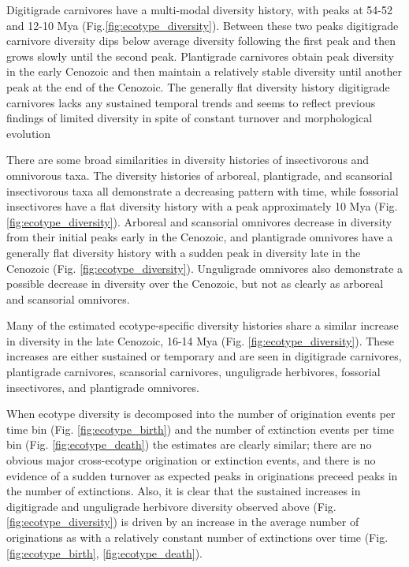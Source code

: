 \documentclass[12pt,letterpaper]{article}
\begin{document}
Digitigrade carnivores have a multi-modal diversity history, with peaks at 54-52 and 12-10 Mya (Fig.\ref{fig:ecotype_diversity}). Between these two peaks digitigrade carnivore diversity dips below average diversity following the first peak and then grows slowly until the second peak. Plantigrade carnivores obtain peak diversity in the early Cenozoic and then maintain a relatively stable diversity until another peak at the end of the Cenozoic. The generally flat diversity history digitigrade carnivores lacks any sustained temporal trends and seems to reflect previous findings of limited diversity in spite of constant turnover and morphological evolution \citep{Valkenburgh1999,Silvestro2015b,Slater2015c}

There are some broad similarities in diversity histories of insectivorous and omnivorous taxa. The diversity histories of arboreal, plantigrade, and scansorial insectivorous taxa all demonstrate a decreasing pattern with time, while fossorial insectivores have a flat diversity history with a peak approximately 10 Mya (Fig. \ref{fig:ecotype_diversity}). Arboreal and scansorial omnivores decrease in diversity from their initial peaks early in the Cenozoic, and plantigrade omnivores have a generally flat diversity history with a sudden peak in diversity late in the Cenozoic (Fig. \ref{fig:ecotype_diversity}). Unguligrade omnivores also demonstrate a possible decrease in diversity over the Cenozoic, but not as clearly as arboreal and scansorial omnivores.

Many of the estimated ecotype-specific diversity histories share a similar increase in diversity in the late Cenozoic, 16-14 Mya (Fig. \ref{fig:ecotype_diversity}). These increases are either sustained or temporary and are seen in digitigrade carnivores, plantigrade carnivores, scansorial carnivores, unguligrade herbivores, fossorial insectivores, and plantigrade omnivores.

When ecotype diversity is decomposed into the number of origination events per time bin (Fig. \ref{fig:ecotype_birth}) and the number of extinction events per time bin (Fig. \ref{fig:ecotype_death}) the estimates are clearly similar; there are no obvious major cross-ecotype origination or extinction events, and there is no evidence of a sudden turnover as expected peaks in originations preceed peaks in the number of extinctions. Also, it is clear that the sustained increases in digitigrade and unguligrade herbivore diversity observed above (Fig. \ref{fig:ecotype_diversity}) is driven by an increase in the average number of originations as with a relatively constant number of extinctions over time (Fig. \ref{fig:ecotype_birth}, \ref{fig:ecotype_death}).
\end{document}
